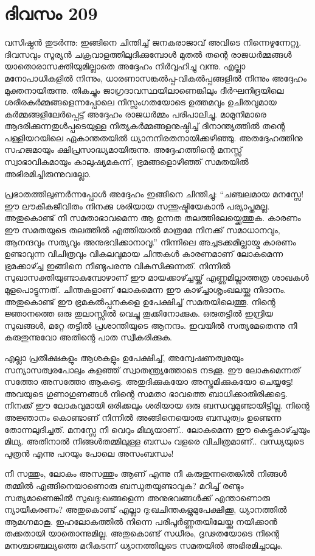 \section{ദിവസം 209}


വസിഷ്ഠൻ തുടർന്നു: ഇങ്ങിനെ ചിന്തിച്ച് ജനകരാജാവ് അവിടെ നിന്നെഴുന്നേറ്റു. ദിവസവും സൂര്യൻ ചക്രവാളത്തിലുദിക്കുമ്പോള്‍ മുതൽ തന്റെ രാജധർമ്മങ്ങൾ യാതൊരാസക്തിയുമില്ലാതെ അദ്ദേഹം  നിർവ്വഹിച്ചു വന്നു. എല്ലാ മനോപാധികളിൽ നിന്നും, ധാരണാസങ്കൽപ്പ-വികൽപ്പങ്ങളിൽ നിന്നും അദ്ദേഹം മുക്തനായിരുന്നു. തികച്ചും ജാഗ്രദാവസ്ഥയിലാണെങ്കിലും ദീർഘനിദ്രയിലെ ശരീരകർമ്മങ്ങളെന്നപ്പോലെ നിസ്സംഗതയോടെ ഉത്തമവും ഉചിതവുമായ കർമ്മങ്ങളിലേർപ്പെട്ട് അദ്ദേഹം രാജധർമ്മം പരിപാലിച്ചു. മാമുനിമാരെ ആദരിക്കുന്നതുൾപ്പടെയുള്ള നിത്യകർമ്മങ്ങളനുഷ്ഠിച്ച് ദിനാന്ത്യത്തിൽ തന്റെ പള്ളിയറയിലെ ഏകാന്തതയിൽ ധ്യാനനിരതനായിക്കഴിഞ്ഞു. അതദ്ദേഹത്തിനു സഹജമായും ക്ഷിപ്രസാദ്ധ്യമായിരുന്നു. അദ്ദേഹത്തിന്റെ മനസ്സ് സ്വാഭാവികമായും കാലുഷ്യമകന്ന്, ഭ്രമങ്ങളൊഴിഞ്ഞ് സമതയിൽ അഭിരമിച്ചിരുന്നുവല്ലോ.

പ്രഭാതത്തിലുണർന്നപ്പോൾ അദ്ദേഹം ഇങ്ങിനെ ചിന്തിച്ചു: “ചഞ്ചലമായ മനസ്സേ! ഈ ലൗകീകജീവിതം നിനക്കു ശരിയായ സന്തുഷ്ടിയേകാൻ പര്യാപ്തമല്ല. അതുകൊണ്ട് നീ സമതാഭാവമെന്ന ആ ഉന്നത തലത്തിലേയ്ക്കെത്തുക. കാരണം ഈ സമതയുടെ തലത്തിൽ എത്തിയാൽ മാത്രമേ നിനക്ക് സമാധാനവും, ആനന്ദവും സത്യവും അനുഭവിക്കാനാവൂ.” നിന്നിലെ അച്ചടക്കമില്ലായ്മ കാരണം ഉണ്ടാവുന്ന വിചിത്രവും വികലവുമായ ചിന്തകൾ കാരണമാണ് ലോകമെന്ന  ഭ്രമക്കാഴ്ച്ച ഇങ്ങിനെ നീണ്ടുപരന്നു വികസിക്കുന്നത്. നിന്നിൽ സുഖാസക്തിയുണ്ടാകുമ്പോഴാണ്‌ ഈ മായക്കാഴ്ച്ചയ്ക്ക് എണ്ണമില്ലാത്തത്ര ശാഖകൾ മുളപൊട്ടുന്നത്. ചിന്തകളാണ്‌ ലോകമെന്ന ഈ കാഴ്ച്ചാശൃംഖലയ്ക്കു നിദാനം. അതുകൊണ്ട് ഈ ഭ്രമകൽപ്പനകളെ ഉപേക്ഷിച്ച് സമതയിലെത്തൂ. നിന്റെ ജ്ഞാനത്തെ ഒരു തുലാസ്സിൽ വെച്ചു തൂക്കിനോക്കുക. ഒരുതട്ടിൽ ഇന്ദ്രിയ സുഖങ്ങൾ, മറ്റേ തട്ടിൽ പ്രശാന്തിയുടെ ആനന്ദം. ഇവയിൽ സത്യമേതെന്നു നീ കരുതുന്നുവോ അതിന്റെ പാത സ്വീകരിക്കുക.

എല്ലാ പ്രതീക്ഷകളും ആശകളും ഉപേക്ഷിച്ച്, അന്വേഷണത്വരയും സന്യാസത്വരപോലും  കളഞ്ഞ് സ്വാതന്ത്ര്യത്തോടെ നടക്കൂ. ഈ ലോകമെന്നത് സത്തോ അസത്തോ ആകട്ടെ. അതുദിക്കുകയോ അസ്തമിക്കുകയോ ചെയ്യട്ടേ! അവയുടെ ഗുണാഗുണങ്ങൾ നിന്റെ സമതാ ഭാവത്തെ ബാധിക്കാതിരിക്കട്ടെ. നിനക്ക് ഈ ലോകവുമായി ഒരിക്കലും ശരിയായ ഒരു ബന്ധവുമുണ്ടായിട്ടില്ല. നിന്റെ അജ്ഞാനം കൊണ്ടാണ്‌ നിന്നിൽ അങ്ങിനെയൊരു ബന്ധുത്വം ഉണ്ടെന്ന തോന്നലുദിച്ചത്. മനസ്സേ നീ വെറും മിഥ്യയാണ്‌.. ലോകമെന്ന ഈ കെട്ടുകാഴ്ച്ചയും മിഥ്യ. അതിനാൽ നിങ്ങൾതമ്മിലുള്ള ബന്ധം വളരെ വിചിത്രമാണ്‌.. വന്ധ്യയുടെ പുത്രൻ എന്നു പറയും പോലെ അസംബന്ധം!

നീ സത്തും, ലോകം അസത്തും ആണ് എന്നു നീ കരുതുന്നതെങ്കിൽ നിങ്ങൾ തമ്മിൽ എങ്ങിനെയാണൊരു ബന്ധുതയുണ്ടാവുക? മറിച്ച് രണ്ടും സത്യമാണെങ്കിൽ സുഖദു:ഖങ്ങളെന്ന അനുഭവങ്ങൾക്ക് എന്താണൊരു ന്യായീകരണം? അതുകൊണ്ട് എല്ലാ ദു:ഖചിന്തകളുമുപേക്ഷിക്കൂ, ധ്യാനത്തിൽ ആമഗ്നമാകൂ. ഇഹലോകത്തിൽ നിന്നെ പരിപൂർണ്ണതയിലേയ്ക്കു നയിക്കാൻ തക്കതായി യാതൊന്നുമില്ല. അതുകൊണ്ട് സധീരം, ദൃഢതയോടെ നിന്റെ മനശ്ചാഞ്ചല്യത്തെ മറികടന്ന് ധ്യാനത്തിലൂടെ സമതയിൽ അഭിരമിച്ചാലും. 

